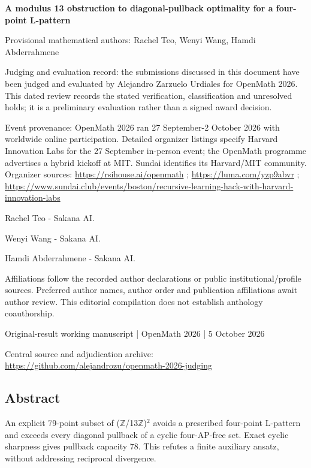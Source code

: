 \documentclass[11pt,a4paper]{article}
\begin{document}
{\LARGE\bfseries A modulus 13 obstruction to diagonal-pullback optimality for a four-point L-pattern\par}\medskip
{\small Provisional mathematical authors: Rachel Teo, Wenyi Wang, Hamdi Abderrahmene\par}\medskip
{\small Judging and evaluation record: the submissions discussed in this document have been judged and evaluated by Alejandro Zarzuelo Urdiales for OpenMath 2026. This dated review records the stated verification, classification and unresolved holds; it is a preliminary evaluation rather than a signed award decision.\par}

{\small Event provenance: OpenMath 2026 ran 27 September-2 October 2026 with worldwide online participation. Detailed organizer listings specify Harvard Innovation Labs for the 27 September in-person event; the OpenMath programme advertises a hybrid kickoff at MIT. Sundai identifies its Harvard/MIT community. Organizer sources: \url{https://rsihouse.ai/openmath} ; \url{https://luma.com/yzp9abvr} ; \url{https://www.sundai.club/events/boston/recursive-learning-hack-with-harvard-innovation-labs}\par}

{\small Rachel Teo  -  Sakana AI.\par}

{\small Wenyi Wang  -  Sakana AI.\par}

{\small Hamdi Abderrahmene  -  Sakana AI.\par}

{\small Affiliations follow the recorded author declarations or public institutional/profile sources. Preferred author names, author order and publication affiliations await author review. This editorial compilation does not establish anthology coauthorship.\par}

{\small Original-result working manuscript | OpenMath 2026 | 5 October 2026\par}\medskip
{\small Central source and adjudication archive: \url{https://github.com/alejandrozu/openmath-2026-judging}\par}

\subsection{Abstract}
An explicit 79-point subset of (\ensuremath{\mathbb{Z}}/13\ensuremath{\mathbb{Z}})\ensuremath{^2} avoids a prescribed four-point L-pattern and exceeds every diagonal pullback of a cyclic four-AP-free set. Exact cyclic sharpness gives pullback capacity 78. This refutes a finite auxiliary ansatz, without addressing reciprocal divergence.
\end{document}
